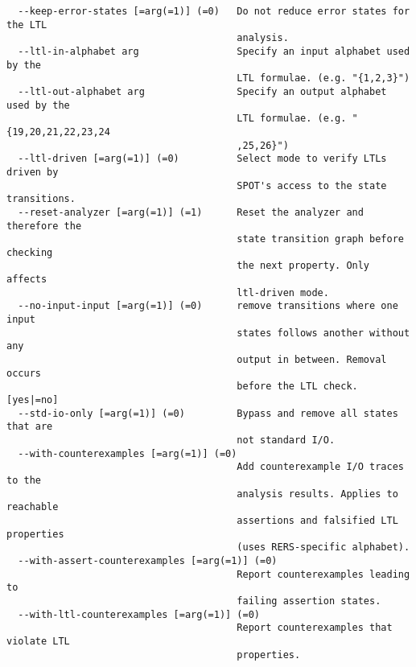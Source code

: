 \documentclass[natbib]{article}
\begin{document}
\begin{verbatim}
  --keep-error-states [=arg(=1)] (=0)   Do not reduce error states for the LTL 
                                        analysis.
  --ltl-in-alphabet arg                 Specify an input alphabet used by the 
                                        LTL formulae. (e.g. "{1,2,3}")
  --ltl-out-alphabet arg                Specify an output alphabet used by the 
                                        LTL formulae. (e.g. "{19,20,21,22,23,24
                                        ,25,26}")
  --ltl-driven [=arg(=1)] (=0)          Select mode to verify LTLs driven by 
                                        SPOT's access to the state transitions.
  --reset-analyzer [=arg(=1)] (=1)      Reset the analyzer and therefore the 
                                        state transition graph before checking 
                                        the next property. Only affects 
                                        ltl-driven mode.
  --no-input-input [=arg(=1)] (=0)      remove transitions where one input 
                                        states follows another without any 
                                        output in between. Removal occurs 
                                        before the LTL check. [yes|=no]
  --std-io-only [=arg(=1)] (=0)         Bypass and remove all states that are 
                                        not standard I/O.
  --with-counterexamples [=arg(=1)] (=0)
                                        Add counterexample I/O traces to the 
                                        analysis results. Applies to reachable 
                                        assertions and falsified LTL properties
                                        (uses RERS-specific alphabet).
  --with-assert-counterexamples [=arg(=1)] (=0)
                                        Report counterexamples leading to 
                                        failing assertion states.
  --with-ltl-counterexamples [=arg(=1)] (=0)
                                        Report counterexamples that violate LTL
                                        properties.
\end{verbatim}
\end{document}
